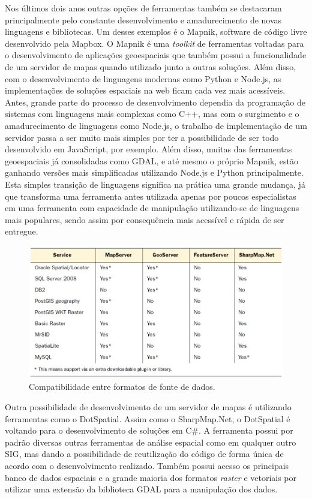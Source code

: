 		Nos últimos dois anos outras opções de ferramentas também se destacaram principalmente pelo constante desenvolvimento e amadurecimento de novas linguagens e bibliotecas. Um desses exemplos é o Mapnik, software de código livre desenvolvido pela Mapbox. O Mapnik é uma \textit{toolkit} de ferramentas voltadas para o desenvolvimento de aplicações geoespaciais que também possui a funcionalidade de um servidor de mapas quando utilizado junto a outras soluções. Além disso, com o desenvolvimento de linguagens modernas como Python e Node.js, as implementações de soluções espaciais na web ficam cada vez mais acessíveis. Antes, grande parte do processo de desenvolvimento dependia da programação de sistemas com linguagens mais complexas como C++, mas com o surgimento e o amadurecimento de linguagens como Node.js, o trabalho de implementação de um servidor passa a ser muito mais simples por ter a possibilidade de ser todo desenvolvido em JavaScript, por exemplo. Além disso, muitas das ferramentas geoespaciais já consolidadas como GDAL, e até mesmo o próprio Mapnik, estão ganhando versões mais simplificadas utilizando Node.js e Python principalmente. Esta simples transição de linguagens significa na prática uma grande mudança, já que transforma uma ferramenta antes utilizada apenas por poucos especialistas em uma ferramenta com capacidade de manipulação utilizando-se de linguagens mais populares, sendo assim por consequência mais acessível e rápida de ser entregue. 
		
		\begin{figure}
			\centering
			\includegraphics[width=1\linewidth]{data/compatibilidade_formatos}
			\caption{Compatibilidade entre formatos de fonte de dados.\cite{OBE_etal11}}
			\label{fig:compatibilidadeformatos}
		\end{figure}
		
		Outra possibilidade de desenvolvimento de um servidor de mapas é utilizando ferramentas como o DotSpatial. Assim como o SharpMap.Net, o DotSpatial é voltando para o desenvolvimento de soluções em C\#. A ferramenta possui por padrão diversas outras ferramentas de análise espacial como em qualquer outro SIG, mas dando a possibilidade de reutilização do código de forma única de acordo com o desenvolvimento realizado. Também possui acesso os principais banco de dados espaciais e a grande maioria dos formatos \textit{raster} e vetoriais por utilizar uma extensão da biblioteca GDAL para a manipulação dos dados.
		
